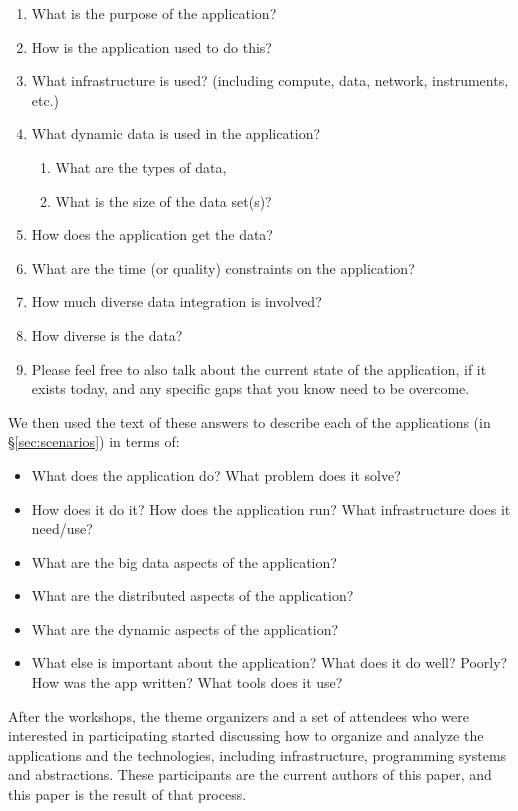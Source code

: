 \begin{enumerate}
\item What is the purpose of the application?
\item How is the application used to do this?
\item What infrastructure is used? (including compute, data, network, instruments, etc.)
\item What dynamic data is used in the application?
\begin{enumerate}
\item What are the types of data,
\item What is the size of the data set(s)?
\end{enumerate}
\item How does the application get the data?
\item What are the time (or quality) constraints on the application?
\item How much diverse data integration is involved?
\item How diverse is the data?
\item Please feel free to also talk about the current state of the
application, if it exists today, and any specific gaps that you know
need to be overcome.
\end{enumerate}

We then used the text of these answers to describe each of the applications (in \S\ref{sec:scenarios}) in terms of:

\begin{itemize}
\item What does the application do? What problem does it solve?
\item How does it do it? How does the application run?  What infrastructure does it need/use?
\item What are the big data aspects of the application?
\item What are the distributed aspects of the application?
\item What are the dynamic aspects  of the application?
\item What else is important about the application?  What does it do well?  Poorly? How was the app written? What tools does it use?
\end{itemize}

After the workshops, the theme organizers and a set of attendees who
were interested in participating started discussing how to organize
and analyze the applications and the technologies, including
infrastructure, programming systems and abstractions.  These
participants are the current authors of this paper, and this paper is
the result of that process.

